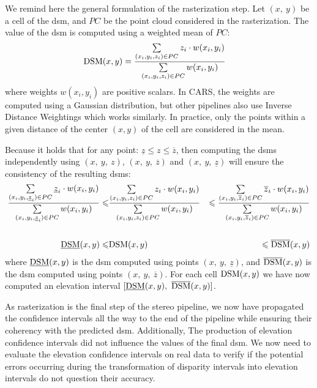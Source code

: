 We remind here the general formulation of the rasterization step. Let $(x,~y)$ be a cell of the \acrshort{dsm}, and $PC$ be the point cloud considered in the rasterization. The value of the \acrshort{dsm} is computed using a weighted mean of $PC$:
\begin{align}
    \mathrm{DSM}(x,y) &= \dfrac{\sum\limits_{(x_i, y_i, z_i)\in PC}z_i\cdot w(x_i, y_i)}{\sum\limits_{(x_i,y_i,z_i)\in PC} w(x_i, y_i)}
\end{align}
where weights $w(x_i,y_i)$ are positive scalars. In CARS, the weights are computed using a Gaussian distribution, but other pipelines also use Inverse Distance Weightings which works similarly. In practice, only the points within a given distance of the center $(x,y)$ of the cell are considered in the mean. 

Because it holds that for any point: $\underline{z}\leqslant z\leqslant\overline{z}$, then computing the \acrshort{dsm}s independently using $(x, ~y, ~z)$, $(x, ~y, ~\overline{z})$ and $(x, ~y, ~\underline{z})$ will ensure the consistency of the resulting \acrshort{dsm}s:
\begin{eqnarray}
    \dfrac{\sum\limits_{(x_i, y_i, \underline{z}_i)\in PC}\underline{z}_i\cdot w(x_i, y_i)}{\sum\limits_{(x_i,y_i, \underline{z}_i)\in PC} w(x_i, y_i)}
    \leqslant&
    \dfrac{\sum\limits_{(x_i, y_i, z_i)\in PC}z_i\cdot w(x_i, y_i)}{\sum\limits_{(x_i,y_i,z_i)\in PC} w(x_i, y_i)}
    &\leqslant
    \dfrac{\sum\limits_{(x_i, y_i, \overline{z}_i)\in PC}\overline{z}_i\cdot w(x_i, y_i)}{\sum\limits_{(x_i,y_i,\overline{z}_i)\in PC} w(x_i, y_i)}\nonumber\\
    &&\nonumber\\
    \underline{\mathrm{DSM}}(x,y) \leqslant& \mathrm{DSM}(x,y) &\leqslant\overline{\mathrm{DSM}}(x,y)
\end{eqnarray}
where $\underline{\mathrm{DSM}}(x,y)$ is the \acrshort{dsm} computed using points $(x, ~y, ~\underline{z})$, and $\overline{\mathrm{DSM}}(x,y)$ is the \acrshort{dsm} computed using points $(x, ~y, ~\overline{z})$. For each cell $\mathrm{DSM}(x,y)$ we have now computed an elevation interval $[\underline{\mathrm{DSM}}(x,y),~\overline{\mathrm{DSM}}(x,y)]$.

As rasterization is the final step of the stereo pipeline, we now have propagated the confidence intervals all the way to the end of the pipeline while ensuring their coherency with the predicted \acrshort{dsm}. Additionally, The production of elevation confidence intervals did not influence the values of the final \acrshort{dsm}. We now need to evaluate the elevation confidence intervals on real data to verify if the potential errors occurring during the transformation of disparity intervals into elevation intervals do not question their accuracy.

